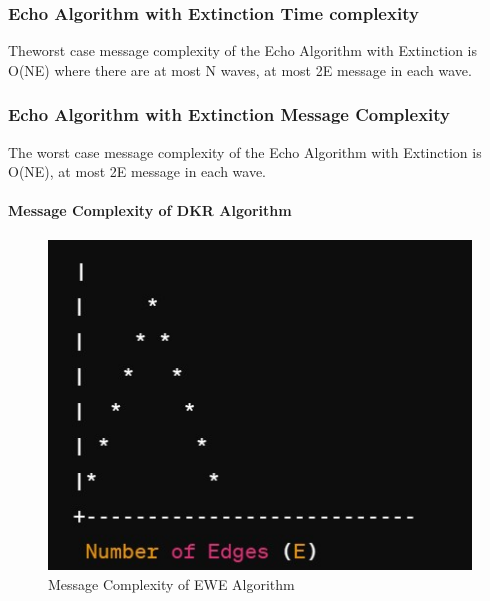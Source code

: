 \documentclass[11pt]{beamer}              %
\begin{document}
\begin{frame}
\frametitle{Echo Algorithm with Extinction Time complexity}
Theworst case message complexity of the Echo Algorithm with Extinction is O(NE) where there are at most N waves, at most 2E message in each wave.
\end{frame}

\begin{frame}
\frametitle{Echo Algorithm with Extinction Message Complexity}
The worst case message complexity of the Echo Algorithm with Extinction is O(NE), at most 2E message in each wave.

\end{frame}


\begin{frame}{}
\framesubtitle{Message Complexity of DKR Algorithm}

\begin{figure}
    \centering
    \includegraphics[scale=0.6]{figures/Screen21.jpg}
    \caption{Message Complexity of EWE Algorithm}
    \label{fig:Message Complexity}
\end{figure}
\note{
}
\end{frame}
\end{document}

